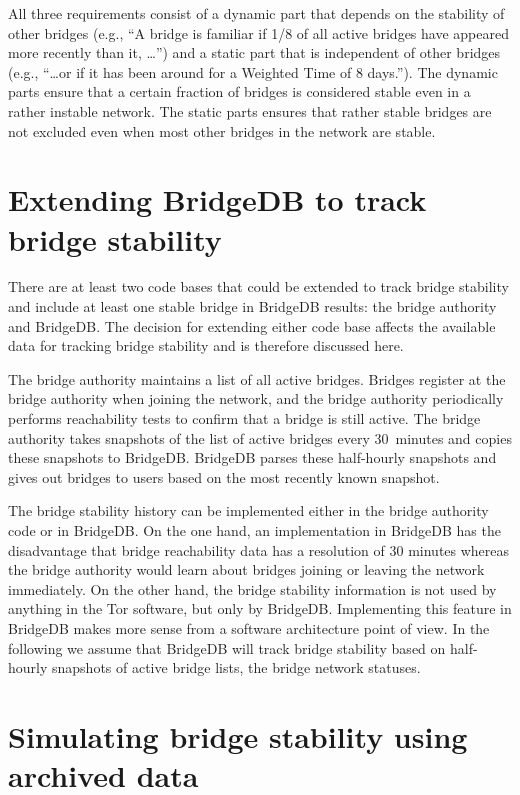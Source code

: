 \documentclass{article}
\begin{document}
All three requirements consist of a dynamic part that depends on the
stability of other bridges (e.g., ``A bridge is familiar if 1/8 of all
active bridges have appeared more recently than it, \ldots'') and a static
part that is independent of other bridges (e.g., ``\ldots or if it has
been around for a Weighted Time of 8 days.'').
The dynamic parts ensure that a certain fraction of bridges is considered
stable even in a rather instable network.
The static parts ensures that rather stable bridges are not excluded even
when most other bridges in the network are stable.

\section{Extending BridgeDB to track bridge stability}

There are at least two code bases that could be extended to track bridge
stability and include at least one stable bridge in BridgeDB results: the
bridge authority and BridgeDB.
The decision for extending either code base affects the available data
for tracking bridge stability and is therefore discussed here.

The bridge authority maintains a list of all active bridges.
Bridges register at the bridge authority when joining the network, and the
bridge authority periodically performs reachability tests to confirm that
a bridge is still active.
The bridge authority takes snapshots of the list of active bridges every
30~minutes and copies these snapshots to BridgeDB.
BridgeDB parses these half-hourly snapshots and gives out bridges to users
based on the most recently known snapshot.

The bridge stability history can be implemented either in the bridge
authority code or in BridgeDB.
On the one hand, an implementation in BridgeDB has the disadvantage that
bridge reachability data has a resolution of 30 minutes whereas the bridge
authority would learn about bridges joining or leaving the network
immediately.
On the other hand, the bridge stability information is not used by
anything in the Tor software, but only by BridgeDB.
Implementing this feature in BridgeDB makes more sense from a software
architecture point of view.
In the following we assume that BridgeDB will track bridge stability based
on half-hourly snapshots of active bridge lists, the bridge network
statuses.

\section{Simulating bridge stability using archived data}
\end{document}
